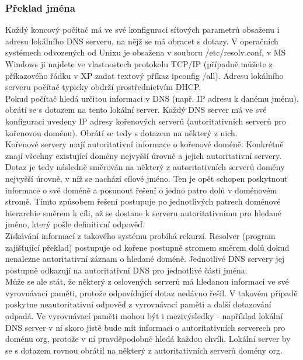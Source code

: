 \documentclass[10pt,a4paper]{article}
\begin{document}
\subsubsection{Překlad jména}
Každý koncový počítač má ve své konfiguraci síťových parametrů obsaženu i adresu lokálního DNS serveru, na nějž se má obracet s dotazy. V operačních systémech odvozených od Unixu je obsažena v souboru /etc/resolv.conf, v MS Windows ji najdete ve vlastnostech protokolu TCP/IP (případně můžete z příkazového řádku v XP zadat textový příkaz ipconfig /all). Adresu lokálního serveru počítač typicky obdrží prostřednictvím DHCP. \\
Pokud počítač hledá určitou informaci v DNS (např. IP adresu k danému jménu), obrátí se s dotazem na tento lokální server. Každý DNS server má ve své konfiguraci uvedeny IP adresy kořenových serverů (autoritativních serverů pro kořenovou doménu). Obrátí se tedy s dotazem na některý z nich. \\
Kořenové servery mají autoritativní informace o kořenové doméně. Konkrétně znají všechny existující domény nejvyšší úrovně a jejich autoritativní servery. Dotaz je tedy následně směrován na některý z autoritativních serverů domény nejvyšší úrovně, v níž se nachází cílové jméno. Ten je opět schopen poskytnout informace o své doméně a posunout řešení o jedno patro dolů v doménovém stromě. Tímto způsobem řešení postupuje po jednotlivých patrech doménové hierarchie směrem k cíli, až se dostane k serveru autoritativnímu pro hledané jméno, který pošle definitivní odpověď. \\
Získávání informací z takového systému probíhá rekurzí. Resolver (program zajišťující překlad) postupuje od kořene postupně stromem směrem dolů dokud nenalezne autoritativní záznam o hledané doméně. Jednotlivé DNS servery jej postupně odkazují na autoritativní DNS pro jednotlivé části jména. \\
Může se ale stát, že některý z oslovených serverů má hledanou informaci ve své vyrovnávací paměti, protože odpovídající dotaz nedávno řešil. V takovém případě poskytne neautoritativní odpověď z vyrovnávací paměti a další dotazování odpadá. Ve vyrovnávací paměti mohou být i mezivýsledky - například lokální DNS server v ní skoro jistě bude mít informaci o autoritativních serverech pro doménu org, protože v ní pravděpodobně hledá každou chvíli. Lokální server by se s dotazem rovnou obrátil na některý z autoritativních serverů domény org.\\
\end{document}
